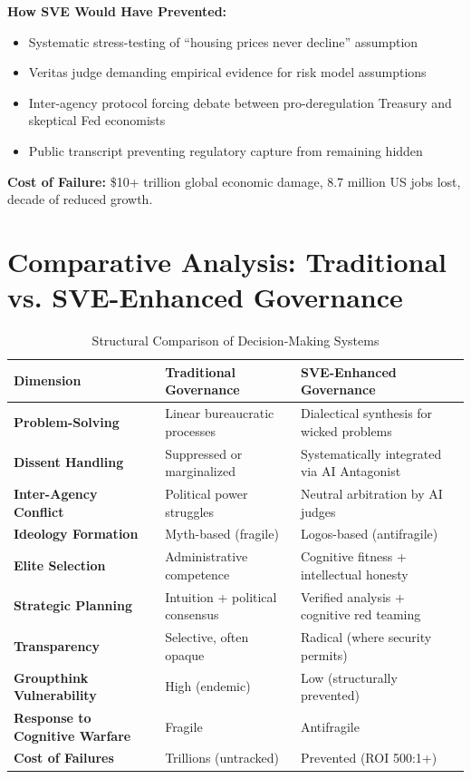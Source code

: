 \documentclass[11pt,a4paper]{article}
\begin{document}
\begin{small}
\textbf{How SVE Would Have Prevented:}
\begin{itemize}[nosep]
    \item Systematic stress-testing of ``housing prices never decline'' assumption
    \item Veritas judge demanding empirical evidence for risk model assumptions
    \item Inter-agency protocol forcing debate between pro-deregulation Treasury and skeptical Fed economists
    \item Public transcript preventing regulatory capture from remaining hidden
\end{itemize}

\textbf{Cost of Failure:} \$10+ trillion global economic damage, 8.7 million US jobs lost, decade of reduced growth.

\section{Comparative Analysis: Traditional vs. SVE-Enhanced Governance}
\label{app:comparison}

\begin{table}[h!]
\centering
\caption{Structural Comparison of Decision-Making Systems}
\label{tab:governance_comparison}
\begin{tabular}{@{}p{4cm}p{5cm}p{5cm}@{}}
\toprule
\textbf{Dimension} & \textbf{Traditional Governance} & \textbf{SVE-Enhanced Governance} \\
\midrule
\textbf{Problem-Solving} & Linear bureaucratic processes & Dialectical synthesis for wicked problems \\
\addlinespace
\textbf{Dissent Handling} & Suppressed or marginalized & Systematically integrated via AI Antagonist \\
\addlinespace
\textbf{Inter-Agency Conflict} & Political power struggles & Neutral arbitration by AI judges \\
\addlinespace
\textbf{Ideology Formation} & Myth-based (fragile) & Logos-based (antifragile) \\
\addlinespace
\textbf{Elite Selection} & Administrative competence & Cognitive fitness + intellectual honesty \\
\addlinespace
\textbf{Strategic Planning} & Intuition + political consensus & Verified analysis + cognitive red teaming \\
\addlinespace
\textbf{Transparency} & Selective, often opaque & Radical (where security permits) \\
\addlinespace
\textbf{Groupthink Vulnerability} & High (endemic) & Low (structurally prevented) \\
\addlinespace
\textbf{Response to Cognitive Warfare} & Fragile & Antifragile \\
\addlinespace
\textbf{Cost of Failures} & Trillions (untracked) & Prevented (ROI 500:1+) \\
\bottomrule
\end{tabular}
\end{table}



\end{small}
\end{document}
